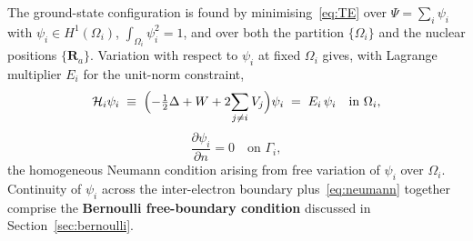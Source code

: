 \documentclass[11pt]{article}
\begin{document}
The ground-state configuration is found by minimising~\eqref{eq:TE} over $\Psi = \sum_i \psi_i$ with $\psi_i \in H^1(\Omega_i)$, $\int_{\Omega_i} \psi_i^2 = 1$, and over both the partition $\{\Omega_i\}$ and the nuclear positions $\{\mathbf{R}_a\}$. Variation with respect to $\psi_i$ at fixed $\Omega_i$ gives, with Lagrange multiplier $E_i$ for the unit-norm constraint,
\begin{equation}\label{eq:Hi}
\mathcal{H}_i \psi_i \;\equiv\; \Bigl(-\tfrac{1}{2}\Delta + W + 2\!\sum_{j \ne i} V_j\Bigr)\psi_i \;=\; E_i\, \psi_i \quad \text{in } \Omega_i,
\end{equation}
\begin{equation}\label{eq:neumann}
\frac{\partial \psi_i}{\partial n} = 0 \quad \text{on } \Gamma_i,
\end{equation}
the homogeneous Neumann condition arising from free variation of $\psi_i$ over $\Omega_i$. Continuity of $\psi_i$ across the inter-electron boundary plus~\eqref{eq:neumann} together comprise the \textbf{Bernoulli free-boundary condition} discussed in Section~\ref{sec:bernoulli}.
\end{document}
